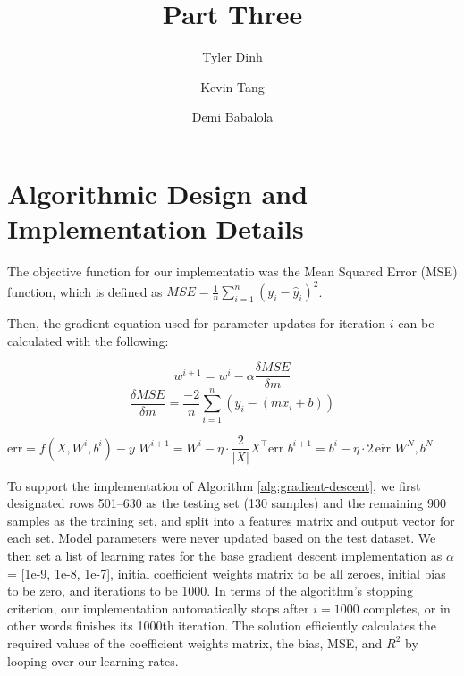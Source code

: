 \documentclass[12pt,letterpaper]{article}
\title{\huge Part Three}
\author[1]{Tyler Dinh}
\author[1]{Kevin Tang}
\author[1]{Demi Babalola}
\affil[1]{Washington University in St. Louis}
\begin{document}
\maketitle

\newpage

\section{Algorithmic Design and Implementation Details}


The objective function for our implementatio was the Mean Squared Error (MSE) function, which is defined as $MSE = \frac{1}{n} \sum_{i=1}^{n}(y_i - \hat y_i)^2$.

Then, the gradient equation used for parameter updates for iteration $i$ can be calculated with the following:

\[w^{i+1} = w^{i} - \alpha \frac{\delta MSE}{\delta m}\]
\[\frac{\delta MSE}{\delta m} = \frac{-2}{n} \sum_{i=1}^{n}(y_i - (mx_i + b))\]

\begin{algorithm}
    \caption{Custom Gradient Descent Implementation}
    \label{alg:gradient-descent}
    \begin{algorithmic}
                \State $\text{err} = f(X, W^{i}, b^{i}) - y$
                \State $W^{i+1} = W^{i} - \eta \cdot \dfrac{2}{|X|} X^{\top} \text{err}$
                \State $b^{i+1} = b^{i} - \eta \cdot 2\,\overline{\text{err}}$
            \EndFor
            \State \Return $W^{N}, b^{N}$
        \EndProcedure
    \end{algorithmic}
\end{algorithm}

To support the implementation of Algorithm \ref{alg:gradient-descent}, we first designated rows 501–630 as the testing set (130 samples) and the remaining 900
samples as the training set, and split into a features matrix and output vector for each set. Model parameters were never updated based on the test dataset. We then set a list of learning rates for the base gradient descent implementation as $\alpha$ = [1e-9, 1e-8, 1e-7], initial coefficient weights matrix to be all zeroes, initial bias to be zero, and iterations to be 1000. In terms of the algorithm's stopping criterion, our implementation automatically stops after $i=1000$ completes, or in other words finishes its 1000th iteration. The solution efficiently calculates the required values of the coefficient weights matrix, the bias, MSE, and $R^2$ by looping over our learning rates.
\end{document}
